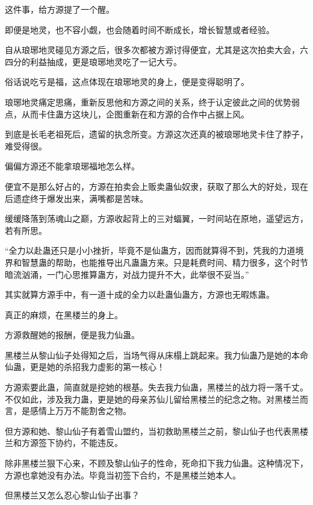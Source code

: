 
\begin{this_body}



这件事，给方源提了一个醒。

即便是地灵，也不容小觑，也会随着时间不断成长，增长智慧或者经验。

自从琅琊地灵碰见方源之后，很多次都被方源讨得便宜，尤其是这次拍卖大会，六四分的利益抽成，更是琅琊地灵吃了一记大亏。

俗话说吃亏是福，这点体现在琅琊地灵的身上，便是变得聪明了。

琅琊地灵痛定思痛，重新反思他和方源之间的关系，终于认定彼此之间的优势弱点，从而卡住蛊方这块儿，企图重新在和方源的合作中占据上风。

到底是长毛老祖死后，遗留的执念所变。方源这次还真的被琅琊地灵卡住了脖子，难受得很。

偏偏方源还不能拿琅琊福地怎么样。

便宜不是那么好占的，方源在拍卖会上贩卖蛊仙奴隶，获取了那么大的好处，现在后遗症终于爆发出来，满嘴都是苦味。

缓缓降落到荡魂山之巅，方源收起背上的三对蝠翼，一时间站在原地，遥望远方，若有所思。

“全力以赴蛊还只是小小挫折，毕竟不是仙蛊方，因而就算得不到，凭我的力道境界和智慧蛊的帮助，也能推导出凡蛊蛊方来。只是耗费时间、精力很多，这个时节暗流汹涌，一门心思推算蛊方，对战力提升不大，此举很不妥当。”

其实就算方源手中，有一道十成的全力以赴蛊仙蛊方，方源也无暇炼蛊。

真正的麻烦，在黑楼兰的身上。

方源救醒她的报酬，便是我力仙蛊。

黑楼兰从黎山仙子处得知之后，当场气得从床榻上跳起来。我力仙蛊乃是她的本命仙蛊，更是她的杀招我力虚影的第一核心！

方源索要此蛊，简直就是挖她的根基。失去我力仙蛊，黑楼兰的战力将一落千丈。不仅如此，涉及我力蛊，更是她的母亲苏仙儿留给黑楼兰的纪念之物。对黑楼兰而言，是感情上万万不能割舍之物。

但方源和她、黎山仙子有着雪山盟约，当初救助黑楼兰之前，黎山仙子也代表黑楼兰和方源签下协约，不能违反。

除非黑楼兰狠下心来，不顾及黎山仙子的性命，死命扣下我力仙蛊。这种情况下，方源也拿她没有办法。毕竟当初签下合约，不是黑楼兰她本人。

但黑楼兰又怎么忍心黎山仙子出事？


\end{this_body}
